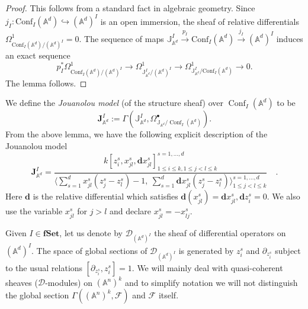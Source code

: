 \documentclass[11pt]{amsart}
\theoremstyle{definition}
\theoremstyle{remark}
\numberwithin{equation}{section}
\newcommand{\bu}{\bullet}
\renewcommand{\AA}{\mathbb{A}}
\newcommand{\op}{\operatorname}
\begin{document}
\begin{proof}
This follows from a standard fact in algebraic geometry. Since $j_{{I}}\colon \mathrm{Conf}_{{I}}(\mathbb{A}^d)
\hookrightarrow (\mathbb{A}^d)^{{I}}$ is an open immersion, the sheaf of relative differentials $\Omega^1_{\mathrm{Conf}_{{I}}(\mathbb{A}^d)/(\mathbb{A}^d)^{{I}}}=0$. The sequence of maps $\mathbb{J}_{\mathbb{A}^d}^{{I}}\xrightarrow{p_{{I}}}\mathrm{Conf}_{{I}}(\mathbb{A}^d)\xrightarrow{j_{{I}}}(\mathbb{A}^d)^{{I}}$ induces an exact sequence
\[
p^*_{{I}}\Omega^1_{\mathrm{Conf}_{{I}}(\mathbb{A}^d)/(\mathbb{A}^d)^{{I}}}\rightarrow\Omega^{1}_{\mathbb{J}_{\mathbb{A}^d}^{{I}}/(\mathbb{A}^d)^{{I}}}\rightarrow  \Omega^{1}_{\mathbb{J}_{\mathbb{A}^d}^{{I}}/\mathrm{Conf}_{{I}}(\mathbb{A}^d)}\rightarrow 0.
\]
The lemma follows.
\end{proof}

We define the \textit{Jouanolou model} (of the structure sheaf) over $\op{Conf}_I(\AA^d)$ to be 
\begin{equation}\label{}
  \mathbf{J}_{\AA^d}^I := \Gamma(\mathbb{J}_{\AA^d}^I, \Omega^\bu_{\mathbb{J}_{\AA^d}/\op{Conf}_I(\AA^d)}) .
\end{equation}
From the above lemma, we have the following explicit description of the Jouanolou model
\[
\mathbf{J}_{\mathbb{A}^d}^{{I}}=\frac{k[z^s_i,x^s_{jl},\mathbf{d}x^s_{jl}]^{s=1,\dots,d}_{1\leq i\leq k, 1\leq j<l\leq k}}{\langle \sum\limits_{s=1}^dx^s_{jl}(z^s_j-z^s_l)-1,\ \sum\limits_{s=1}^d\mathbf{d}x^s_{jl}(z^s_j-z^s_l) \rangle^{s=1,\dots,d}_{1\leq j<l\leq k}}\quad .
\]
Here $\mathbf{d}$ is the relative differential which satisfies $\mathbf{d}(x^s_{jl})=\mathbf{d}x^s_{jl}, \mathbf{d}z^s_i=0$. We also use the variable $x^s_{jl}$ for $j>l$ and declare $x^s_{jl}=-x^s_{lj}$.


Given ${I}\in {\mathbf{fSet}}$, let us denote by $\mathcal{D}_{(\mathbb{A}^d)^{{I}}}$ the sheaf of differential
operators on $(\mathbb{A}^d)^{{I}}$. The space of global sections of $\mathcal{D}_{(\mathbb{A}^d)^{{I}}}$ is generated
by $z^s_{i}$ and $ \partial_{z^s_{i}}$ subject to the usual relations $[\partial_{z^s_{i}},z^s_{i}]=1$. 
We will mainly deal with quasi-coherent sheaves ($\mathcal{D}$-modules) on $(\mathbb{A}^n)^k$ and to simplify notation we will not distinguish the global section $\Gamma\left((\mathbb{A}^n)^k,\mathcal{F}\right)$ and $\mathcal{F}$ itself.
\end{document}
